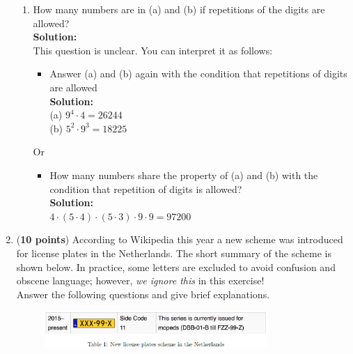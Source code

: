 \documentclass[a4paper]{article}
\begin{document}
\begin{enumerate}
\begin{enumerate}
	
	
	\item How many numbers are in (a) and (b) if repetitions of the digits are allowed?\\
	\textbf{Solution:}\\


This question is unclear. You can interpret it as follows:

\begin{itemize}
	\item Answer (a) and (b) again with the condition that repetitions of digits are allowed\\
	\textbf{Solution:}\\
	
	(a) $9^4 \cdot 4 = 26244$\\
	(b)	$5^2 \cdot 9^3 = 18225$\\
	
\end{itemize}	

Or 
	
\begin{itemize}
	\item How many numbers share the property of (a) and (b) with the condition that repetition of digits is allowed?\\
	\textbf{Solution:}\\
	
	$4 \cdot (5 \cdot 4) \cdot (5 \cdot 3) \cdot 9 \cdot 9 = 97200$\\
\end{itemize}		
	
	
\end{enumerate}



\item (\textbf{10 points}) According to Wikipedia this year a new scheme was introduced for license plates in the Netherlands. The short summary of the scheme is shown below. In practice, some letters are excluded to avoid confusion and obscene language; however, \textit{we ignore this} in this exercise!\\
Answer the following questions and give brief explanations.

\begin{figure}[ht!]
	\centering
  \includegraphics[width=0.8\textwidth]{license.PNG}
\end{figure}	




\end{enumerate}
\end{document}
